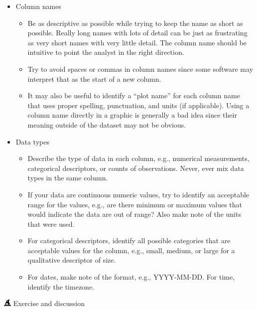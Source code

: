 \documentclass[
  letterpaper,
  DIV=11,
  numbers=noendperiod]{scrreprt}
\providecommand{\tightlist}{%
  \setlength{\itemsep}{0pt}\setlength{\parskip}{0pt}}\usepackage{longtable,booktabs,array}
\begin{document}
\begin{itemize}
\item
  Column names

  \begin{itemize}
  \tightlist
  \item
    Be as descriptive as possible while trying to keep the name as short
    as possible. Really long names with lots of detail can be just as
    frustrating as very short names with very little detail. The column
    name should be intuitive to point the analyst in the right
    direction.\\
  \item
    Try to avoid spaces or commas in column names since some software
    may interpret that as the start of a new column.\\
  \item
    It may also be useful to identify a ``plot name'' for each column
    name that uses proper spelling, punctuation, and units (if
    applicable). Using a column name directly in a graphic is generally
    a bad idea since their meaning outside of the dataset may not be
    obvious.
  \end{itemize}
\item
  Data types

  \begin{itemize}
  \tightlist
  \item
    Describe the type of data in each column, e.g., numerical
    measurements, categorical descriptors, or counts of observations.
    Never, ever mix data types in the same column.\\
  \item
    If your data are continuous numeric values, try to identify an
    acceptable range for the values, e.g., are there minimum or maximum
    values that would indicate the data are out of range? Also make note
    of the units that were used.\\
  \item
    For categorical descriptors, identify all possible categories that
    are acceptable values for the column, e.g., small, medium, or large
    for a qualitative descriptor of size.\\
  \item
    For dates, make note of the format, e.g., YYYY-MM-DD. For time,
    identify the timezone.
  \end{itemize}
\end{itemize}

\includegraphics[width=1em,height=1em]{./impact_files/figure-pdf/fa-icon-20d474448f872ee43905e611a2502347.pdf}
Exercise and discussion
\end{document}
